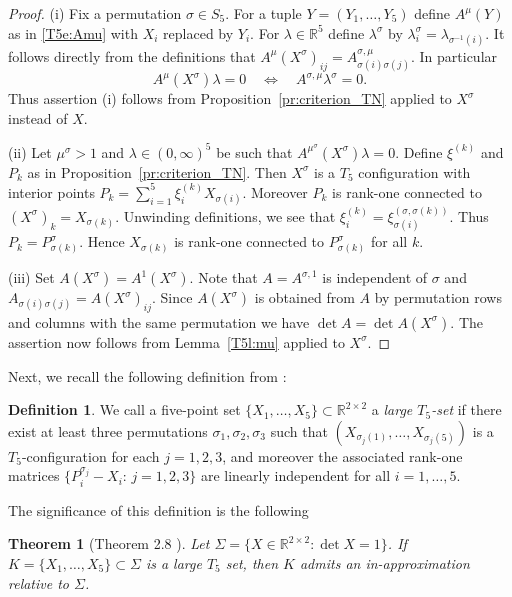 \documentclass[titlepage]{amsart}
\numberwithin{equation}{section}
\theoremstyle{plain}
\newtheorem{theorem}[equation]{Theorem}
\theoremstyle{definition}
\newtheorem{definition}[equation]{Definition}
\theoremstyle{remark}
\newcommand{\R}{\mathbb{R}}
\begin{document}
\begin{proof}  (i) Fix a permutation $\sigma \in S_5$. For a tuple 
$Y = (Y_1, \ldots, Y_5)$ define $A^\mu(Y)$ as in \eqref{T5e:Amu} with $X_i$ replaced by $Y_i$. 
For $\lambda \in \R^5$ define $\lambda^\sigma$ by $\lambda^\sigma_i = \lambda_{\sigma^{-1}(i)}$. 
It follows directly from the definitions that $A^\mu(X^\sigma)_{ij} = A^{\sigma, \mu}_{\sigma(i) \sigma(j)}$.
In particular
$$ A^\mu(X^\sigma) \lambda = 0 \quad \Longleftrightarrow \quad A^{\sigma, \mu} \lambda^\sigma = 0.$$
Thus assertion (i) follows from   Proposition~\ref{pr:criterion_TN} applied to $X^\sigma$ instead of $X$. 

(ii) Let $\mu^\sigma >1$ and $\lambda \in (0,\infty)^5$ be such that $A^{\mu^\sigma}(X^\sigma) \lambda = 0$.
Define $\xi^{(k)}$ and $P_k$ as in Proposition~\ref{pr:criterion_TN}. Then $X^\sigma$ is a $T_5$ configuration with interior points
$P_k = \sum_{i=1}^5 \xi^{(k)}_i X_{\sigma(i)}$. Moreover $P_k$ is rank-one connected to $(X^\sigma)_k = X_{\sigma(k)}$. 
Unwinding definitions, we see that $\xi^{(k)}_i = \xi^{(\sigma, \sigma(k))}_{\sigma(i)}$.
Thus $P_k = P^{\sigma}_{\sigma(k)}$. Hence $X_{\sigma(k)}$ is rank-one connected to $P^\sigma_{\sigma(k)}$ for all $k$. 

(iii) Set $A(X^\sigma) = A^1(X^\sigma)$. Note that $ A = A^{\sigma, 1}$ is independent of $\sigma$ and $A_{\sigma(i) \sigma(j)} = A(X^\sigma)_{ij}$.
Since $A(X^\sigma)$ is obtained from $A$ by permutation rows and columns with the same permutation we have
 $\det A = \det A(X^\sigma)$. The assertion now follows from Lemma~\ref{T5l:mu} applied to $X^\sigma$. 
\end{proof}




Next, we recall the following definition from \cite{szekelyhidi_forster18}:

\begin{definition}\label{T5d:largeT5}
 We call a five-point set $\{X_1,\ldots,X_5\} \subset \R^{2 \times 2}$ a \emph{large $T_5$-set} if there exist at least three permutations $\sigma_1,\sigma_2,\sigma_3$
such that $(X_{\sigma_j(1)},\dots, X_{\sigma_j(5)})$ is a $T_5$-configuration for each $j=1,2,3$, and moreover the associated rank-one matrices $\{P_i^{\sigma_j}-X_i:\,j=1,2,3\}$ 
are linearly independent for all $i=1,\dots,5$.
\end{definition}

The significance of this definition is the following 
\begin{theorem}[Theorem 2.8 \cite{szekelyhidi_forster18}]  \label{th:large_T5}
Let $\Sigma=\{X\in\R^{2\times 2}:\det X=1\}$.
	If $K=\{X_1,\dots,X_5\}\subset\Sigma$ is a large $T_5$ set, then $K$ admits an in-approximation relative to $\Sigma$.
\end{theorem}
\end{document}
